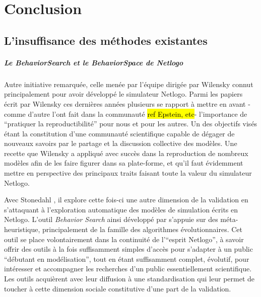 \graphicspath{{Conclusion/}}

\chapter{Conclusion}

\startcontents[chapters]
\Mprintcontents



\section{L'insuffisance des méthodes existantes}
\label{sec:insuffisance_plateformes}

\paragraph{Le \textit{BehaviorSearch} et le \textit{BehaviorSpace} de Netlogo}

Autre initiative remarquée, celle menée par l'équipe dirigée par Wilensky connut principalement pour avoir développé le simulateur Netlogo. Parmi les papiers écrit par Wilensky ces dernières années \autocite{Wilensky2007a} plusieurs se rapport à mettre en avant - comme d'autre l'ont fait dans la communauté \hl{ref Epstein, etc}- l'importance de \enquote{pratiquer la reproductibilité} pour nous et pour les autres. Un des objectifs visés étant la constitution d'une communauté scientifique capable de dégager de nouveaux savoirs par le partage et la discussion collective des modèles. Une recette que Wilensky a appliqué avec succès dans la reproduction de nombreux modèles afin de les faire figurer dans sa plate-forme, et qu'il faut évidemment mettre en perspective des principaux traits faisant toute la valeur du simulateur Netlogo. 

Avec Stonedahl \autocites{Stonedahl2011, Stonedahl2011b, Stonedahl2010}, il explore cette fois-ci une autre dimension de la validation en s'attaquant à l'exploration automatique des modèles de simulation écrits en Netlogo. L'outil \textit{Behavior Search} ainsi développé par \textcite{Stonedahl2011a} s'appuie sur des méta-heuristique, principalement de la famille des algorithmes évolutionnaires. Cet outil se place volontairement dans la continuité de l'\enquote{esprit Netlogo}, à savoir offrir des outils à la fois suffisamment simples d'accès pour s'adapter à un public \enquote{débutant en modélisation}, tout en étant suffisamment complet, évolutif, pour intéresser et accompagner les recherches d'un public essentiellement scientifique. Les outils acquièrent avec leur diffusion à une standardisation qui leur permet de toucher à cette dimension sociale constitutive d'une part de la validation.

